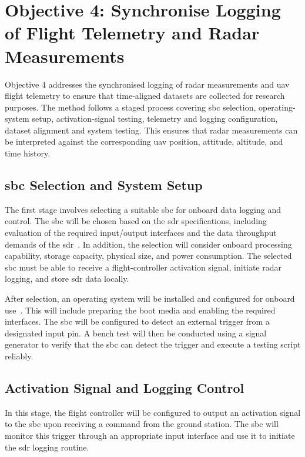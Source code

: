 \section{Objective 4: Synchronise Logging of Flight Telemetry and Radar Measurements}

Objective 4 addresses the synchronised logging of radar measurements and \gls{uav} flight telemetry to ensure that time-aligned datasets are collected for research purposes. The method follows a staged process covering \gls{sbc} selection, operating-system setup, activation-signal testing, telemetry and logging configuration, dataset alignment and system testing. This ensures that radar measurements can be interpreted against the corresponding \gls{uav} position, attitude, altitude, and time history.

\subsection[SBC Selection and System Setup]{\gls{sbc} Selection and System Setup}

The first stage involves selecting a suitable \gls{sbc} for onboard data logging and control. The \gls{sbc} will be chosen based on the \gls{sdr} specifications, including evaluation of the required input/output interfaces and the data throughput demands of the \gls{sdr}~\cite{luswavePUPDUAL24C}. In addition, the selection will consider onboard processing capability, storage capacity, physical size, and power consumption. The selected \gls{sbc} must be able to receive a flight-controller activation signal, initiate radar logging, and store \gls{sdr} data locally.

After selection, an operating system will be installed and configured for onboard use~\cite{ltdRaspberryPiSoftware}. This will include preparing the boot media and enabling the required interfaces. The \gls{sbc} will be configured to detect an external trigger from a designated input pin. A bench test will then be conducted using a signal generator to verify that the \gls{sbc} can detect the trigger and execute a testing script reliably.

\subsection{Activation Signal and Logging Control}
In this stage, the flight controller will be configured to output an activation signal to the \gls{sbc} upon receiving a command from the ground station. The \gls{sbc} will monitor this trigger through an appropriate input interface and use it to initiate the \gls{sdr} logging routine.

